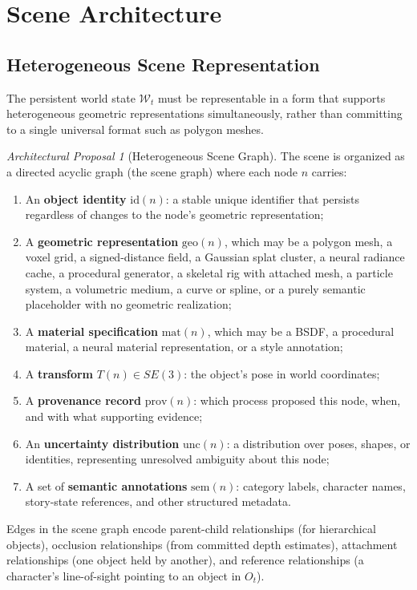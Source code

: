 \documentclass[11pt,a4paper]{article}
\theoremstyle{plain}
\theoremstyle{definition}
\theoremstyle{remark}
\newtheorem{proposal}[theorem]{Architectural Proposal}
\begin{document}
\section{Scene Architecture}
\label{sec:scene}

\subsection{Heterogeneous Scene Representation}

The persistent world state $\mathcal{W}_t$ must be representable in a form that supports heterogeneous geometric representations simultaneously, rather than committing to a single universal format such as polygon meshes.

\begin{proposal}[Heterogeneous Scene Graph]
The scene is organized as a directed acyclic graph (the scene graph) where each node $n$ carries:
\begin{enumerate}[leftmargin=2em,itemsep=0pt]
\item An \textbf{object identity} $\mathrm{id}(n)$: a stable unique identifier that persists regardless of changes to the node's geometric representation;
\item A \textbf{geometric representation} $\mathrm{geo}(n)$, which may be a polygon mesh, a voxel grid, a signed-distance field, a Gaussian splat cluster, a neural radiance cache, a procedural generator, a skeletal rig with attached mesh, a particle system, a volumetric medium, a curve or spline, or a purely semantic placeholder with no geometric realization;
\item A \textbf{material specification} $\mathrm{mat}(n)$, which may be a BSDF, a procedural material, a neural material representation, or a style annotation;
\item A \textbf{transform} $T(n) \in SE(3)$: the object's pose in world coordinates;
\item A \textbf{provenance record} $\mathrm{prov}(n)$: which process proposed this node, when, and with what supporting evidence;
\item An \textbf{uncertainty distribution} $\mathrm{unc}(n)$: a distribution over poses, shapes, or identities, representing unresolved ambiguity about this node;
\item A set of \textbf{semantic annotations} $\mathrm{sem}(n)$: category labels, character names, story-state references, and other structured metadata.
\end{enumerate}
Edges in the scene graph encode parent-child relationships (for hierarchical objects), occlusion relationships (from committed depth estimates), attachment relationships (one object held by another), and reference relationships (a character's line-of-sight pointing to an object in $O_t$).
\end{proposal}
\end{document}
